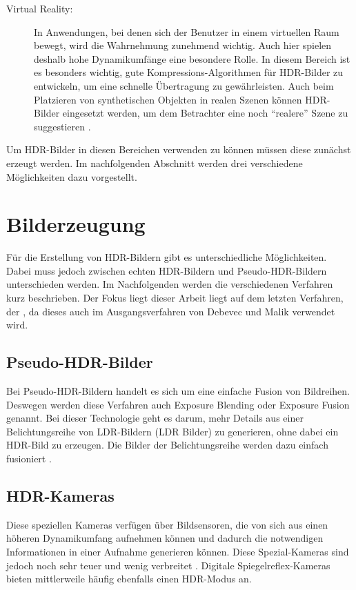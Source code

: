 \begin{description}
\item[Virtual Reality:] In Anwendungen, bei denen sich der Benutzer in einem virtuellen Raum bewegt, wird die Wahrnehmung zunehmend wichtig. Auch hier spielen deshalb hohe Dynamikumfänge eine besondere Rolle. In diesem Bereich ist es besonders wichtig, gute Kompressions-Algorithmen für \gls{HDR}-Bilder zu entwickeln, um eine schnelle Übertragung zu gewährleisten. Auch beim Platzieren von synthetischen Objekten in realen Szenen können \gls{HDR}-Bilder eingesetzt werden, um dem Betrachter eine noch \enquote{realere} Szene zu suggestieren \cite{Debevec:2008:RSO:1401132.1401175}.
\end{description}


Um \gls{HDR}-Bilder in diesen Bereichen verwenden zu können müssen diese zunächst erzeugt werden. Im nachfolgenden Abschnitt werden drei verschiedene Möglichkeiten dazu vorgestellt.


\section{Bilderzeugung}
\label{sec:bilderzeugung}
Für die Erstellung von \gls{HDR}-Bildern gibt es unterschiedliche Möglichkeiten. Dabei muss jedoch zwischen echten \gls{HDR}-Bildern und Pseudo-\gls{HDR}-Bildern unterschieden werden. Im Nachfolgenden werden die verschiedenen Verfahren kurz beschrieben. Der Fokus liegt dieser Arbeit liegt auf dem letzten Verfahren, der , da dieses auch im Ausgangsverfahren von Debevec und Malik verwendet wird.


\subsection{Pseudo-\gls{HDR}-Bilder}
Bei Pseudo-\gls{HDR}-Bildern handelt es sich um eine einfache Fusion von Bildreihen. Deswegen werden diese Verfahren auch Exposure Blending oder Exposure Fusion genannt. Bei dieser Technologie geht es darum, mehr Details aus einer Belichtungsreihe von \acrshort{LDR}-Bildern (\acrlong{LDR} Bilder) zu generieren, ohne dabei ein \gls{HDR}-Bild zu erzeugen. Die Bilder der Belichtungsreihe werden dazu einfach fusioniert \cite{Jing_Hong_Zheng_Rahardja_2012}.

\subsection{HDR-Kameras} 
Diese speziellen Kameras verfügen über Bildsensoren, die von sich aus einen höheren Dynamikumfang aufnehmen können und dadurch die notwendigen Informationen in einer Aufnahme generieren können. Diese Spezial-Kameras sind jedoch noch sehr teuer und wenig verbreitet \cite[S. 95ff]{Bloch2012}. Digitale Spiegelreflex-Kameras bieten mittlerweile häufig ebenfalls einen \gls{HDR}-Modus an.

